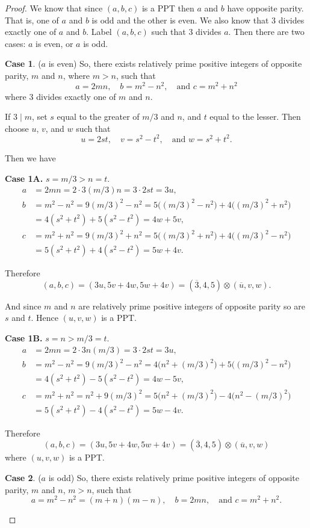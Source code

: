 \documentclass{article}
\theoremstyle{definition}
\newtheorem{case}{Case}[section]
\begin{document}
\begin{proof}
We know that since \((a,b,c)\) is a PPT then \(a\) and \(b\) have opposite parity. That is, one of \(a\) and \(b\) is odd and the other is even. We also know that 3 divides exactly one of \(a\) and \(b\). Label \((a,b,c)\) such that 3 divides \(a\). Then there are two cases: \(a\) is even, or \(a\) is odd.
\begin{case}
(\(a\) is even) So, there exists relatively prime positive integers of opposite parity, \(m\) and \(n\), where \(m > n\), such that \[ a=2mn, \quad b=m^2-n^2, \quad\text{and } c=m^2+n^2 \] where 3 divides exactly one of \(m\) and \(n\).

If \(3\mid m\), set \(s\) equal to the greater of \(m/3\) and \(n\), and \(t\) equal to the lesser. Then choose \(u\), \(v\), and \(w\) such that \[ u=2st, \quad v=s^2-t^2, \quad\text{and } w=s^2+t^2.\]

Then we have

\bigskip
\textbf{Case 1A.} \(s=m/3>n=t\).
\[\begin{aligned}
a &= 2mn = 2\cdot 3(m/3)n = 3\cdot 2st = 3u, \\
b &= m^2-n^2 = 9(m/3)^2-n^2 = 5\big((m/3)^2-n^2\big) + 4\big((m/3)^2+n^2\big) \\
&= 4(s^2+t^2) + 5(s^2-t^2) = 4w+5v, \\
c &= m^2+n^2 = 9(m/3)^2+n^2 = 5\big((m/3)^2+n^2\big) + 4\big((m/3)^2-n^2\big) \\
&= 5(s^2+t^2) + 4(s^2-t^2) = 5w+4v.
\end{aligned}\]

Therefore \[ (a,b,c) = (3u,5v+4w,5w+4v) = (\overline{3},4,5)\otimes (\overline{u},v,w).\]

And since \(m\) and \(n\) are relatively prime positive integers of opposite parity so are \(s\) and \(t\). Hence \((u,v,w)\) is a PPT.

\bigskip
\textbf{Case 1B.} \(s=n>m/3=t\).
\[\begin{aligned}
a &= 2mn = 2\cdot 3n(m/3) = 3\cdot 2st = 3u, \\
b &= m^2-n^2 = 9(m/3)^2-n^2 = 4\big(n^2+(m/3)^2\big) + 5\big((m/3)^2-n^2\big) \\
&= 4(s^2+t^2) - 5(s^2-t^2) = 4w-5v, \\
c &= m^2+n^2 = n^2+9(m/3)^2 = 5\big(n^2+(m/3)^2\big) - 4\big(n^2-(m/3)^2\big) \\
&= 5(s^2+t^2) - 4(s^2-t^2) = 5w-4v.
\end{aligned}\]

Therefore \[ (a,b,c) = (3u,5v+4w,5w+4v) = (\overline{3},4,5)\otimes (\overline{u},v,w)\] where \((u,v,w)\) is a PPT.
\end{case}
\begin{case}
(\(a\) is odd) So, there exists relatively prime positive integers of opposite parity, \(m\) and \(n\), \(m > n\), such that \[ a=m^2-n^2=(m+n)(m-n),  \quad b=2mn, \quad\text{and } c=m^2+n^2.\]


\end{case}
\end{proof}
\end{document}
